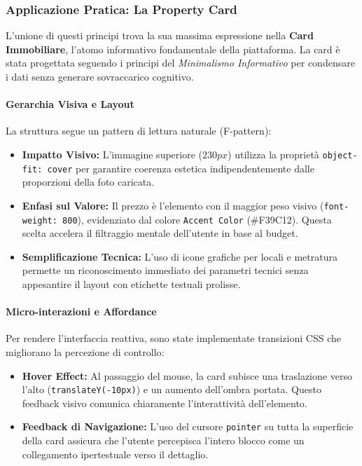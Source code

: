 \documentclass{article}
\begin{document}
\subsubsection{Applicazione Pratica: La Property Card}
L'unione di questi principi trova la sua massima espressione nella \textbf{Card Immobiliare}, l'atomo informativo fondamentale della piattaforma. La card è stata progettata seguendo i principi del \textit{Minimalismo Informativo} per condensare i dati senza generare sovraccarico cognitivo.

\paragraph{Gerarchia Visiva e Layout}
La struttura segue un pattern di lettura naturale (F-pattern):
\begin{itemize}
    \item \textbf{Impatto Visivo:} L'immagine superiore ($230px$) utilizza la proprietà \texttt{object-fit: cover} per garantire coerenza estetica indipendentemente dalle proporzioni della foto caricata.
    \item \textbf{Enfasi sul Valore:} Il prezzo è l'elemento con il maggior peso visivo (\texttt{font-weight: 800}), evidenziato dal colore \texttt{Accent Color} (\#F39C12). Questa scelta accelera il filtraggio mentale dell'utente in base al budget.
    \item \textbf{Semplificazione Tecnica:} L'uso di icone grafiche per locali e metratura permette un riconoscimento immediato dei parametri tecnici senza appesantire il layout con etichette testuali prolisse.
\end{itemize}

\paragraph{Micro-interazioni e Affordance}
Per rendere l'interfaccia reattiva, sono state implementate transizioni CSS che migliorano la percezione di controllo:
\begin{itemize}
    \item \textbf{Hover Effect:} Al passaggio del mouse, la card subisce una traslazione verso l'alto (\texttt{translateY(-10px)}) e un aumento dell'ombra portata. Questo feedback visivo comunica chiaramente l'interattività dell'elemento.
    \item \textbf{Feedback di Navigazione:} L'uso del cursore \texttt{pointer} su tutta la superficie della card assicura che l'utente percepisca l'intero blocco come un collegamento ipertestuale verso il dettaglio.
\end{itemize}
\end{document}
